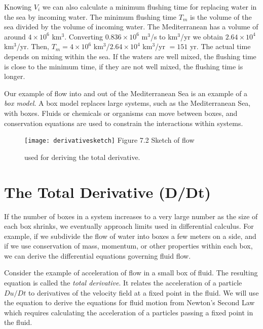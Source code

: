 Knowing $V_i$ we can also calculate a minimum flushing time for
replacing water in the sea by incoming water. The minimum flushing
time $T_m$ is the volume of the sea divided by the volume of incoming
water. The Mediterranean has a volume of around $4 \times 10^6$
km$^3$. Converting $0.836 \times 10^6$ m$^3$/s to km$^3$/yr we obtain
$2.64 \times10^4$ km$^3$/yr. Then, $T_m = 4 \times 10^6$ km$^3$/$2.64
\times 10^4$ km$^3$/yr $= 151$ yr. The actual time depends on
mixing within the sea. If the waters
are well mixed, the flushing time is close to the minimum time, if
they are not well mixed, the flushing time is longer.

Our example of flow into and out of the Mediterranean Sea is an
example of a \textit{box model}. A box model
replaces large systems, such as the Mediterranean Sea, with
boxes. Fluids or chemicals or organisms can move between boxes, and
conservation equations are used to constrain the interactions within
systems.

\begin{figure}[b!]
\texttt{[image: derivativesketch]}
\centering
\footnotesize
Figure 7.2 Sketch of flow \rule{0mm}{4ex}used for deriving the total
derivative.

\label{fig:derivativesketch}
\vspace{-3ex}
\end{figure}

\section{The Total Derivative (D/Dt)}
If the number of boxes in a system
increases to a very large number as the size of each box shrinks, we
eventually approach limits used in differential calculus. For example,
if we subdivide the flow of water into boxes a few meters on a side,
and if we use conservation of mass, momentum, or other properties
within each box, we can derive the differential equations governing
fluid flow.

Consider the example of acceleration of flow in a small box of
fluid. The resulting equation is called the \textit{total
  derivative}. It relates the acceleration of a particle $Du/Dt$ to
derivatives of the velocity field at a fixed point in the fluid. We
will use the equation to derive the equations for fluid motion from
Newton's Second Law which requires calculating the acceleration of a
particles passing a fixed point in the fluid.


